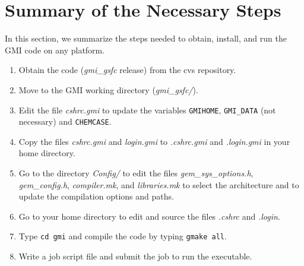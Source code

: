 \section{Summary of the Necessary Steps}
%
In this section, we summarize the steps needed to obtain, install,
and run the GMI code on any platform.
%
\begin{enumerate}
\item Obtain the code ({\em gmi\_gsfc} release) from the cvs repository.
\item Move to the GMI working directory ({\em gmi\_gsfc/}).
\item Edit the file {\em cshrc.gmi} to update the variables 
      {\tt GMIHOME}, {\tt GMI\_DATA} (not necessary) and {\tt CHEMCASE}.
\item Copy the files {\em cshrc.gmi} and {\em login.gmi} to {\em .cshrc.gmi} and 
      {\em .login.gmi} in your home directory.
\item Go to the directory {\em Config/} to edit the files
      {\em gem\_sys\_options.h}, {\em gem\_config.h}, {\em compiler.mk}, and
      {\em libraries.mk} to select the
      architecture and to update the compilation options and paths.
\item Go to your home directory to edit and source the files
      {\em .cshrc} and {\em .login}.
\item Type {\tt cd gmi} and compile the code by typing
      {\tt gmake all}.
\item Write a job script file and submit the job to run the executable.
\end{enumerate}
